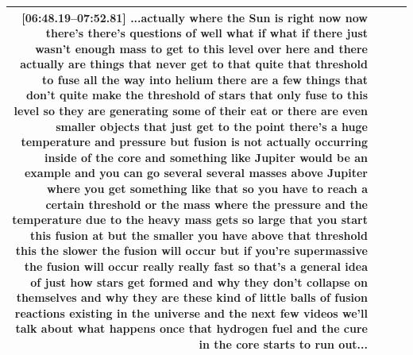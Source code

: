 \documentclass[10pt]{article}
\begin{document}
\begin{tiny}
\begin{longtable}{|r|p{0.375in}|p{1.275in}|p{3.5in}|}
                                                                                                                                                                                                                                                                                                                                                                                                                                                                                                                                                         \textbf{[06:48.19--07:52.81]} ...actually where the Sun is right now now there's there's questions of well what if what if there just wasn't enough mass to get to this level over here and there actually are things that never get to that quite that threshold to fuse all the way into helium there are a few things that don't quite make the threshold of stars that only fuse to this level so they are generating some of their eat or there are even smaller objects that just get to the point there's a huge temperature and pressure but fusion is not actually occurring inside of the core and something like Jupiter would be an example and you can go several several masses above Jupiter where you get something like that so you have to reach a certain threshold or the mass where the pressure and the temperature due to the heavy mass gets so large that you start this fusion at but the smaller you have above that threshold this the slower the fusion will occur but if you're supermassive the fusion will occur really really fast so that's a general idea of just how stars get formed and why they don't collapse on themselves and why they are these kind of little balls of fusion reactions existing in the universe and the next few videos we'll talk about what happens once that hydrogen fuel and the cure in the core starts to run out... \\\hline

\end{longtable}
\end{tiny}
\end{document}

